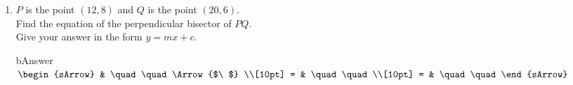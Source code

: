 \clearpage\noindent
{}
\begin{enumerate}[resume] 
  \item $P$ is the point $(12,8)$ and $Q$ is the point $(20,6)$.\\[5mm]
        Find the equation of the perpendicular bisector of $PQ$.\\
		Give your answer in the form $y=mx+c$.
      \begin{envOut}[height=10cm]{bAnswer}
	       $\begin{sArrow}
	             & \quad\quad       \Arrow{$\ $} \\[10pt]
               = & \quad\quad               \\[10pt]      
			   = & \quad\quad  
	        \end{sArrow}$
      \end{envOut}
	  \begin{shortsolution}  
	     $ \quad \quad \quad \quad$
 	  \end{shortsolution}
\end{enumerate}	  


